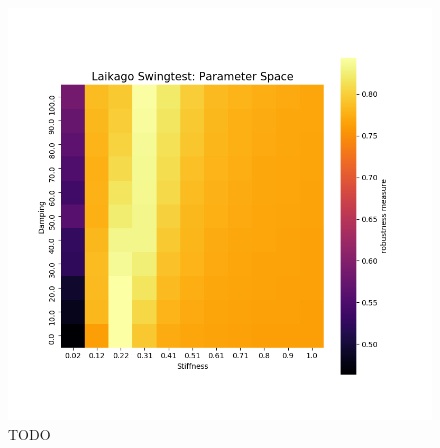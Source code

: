     \begin{figure}[h]\label{fig:}
    \centering
    \includegraphics[width=.7\linewidth]{figures/swingtest_ps.png}
    \caption{TODO}
    \end{figure}    


